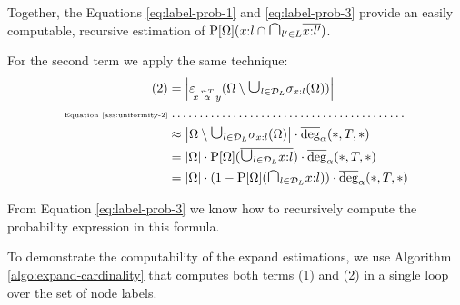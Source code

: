 Together, the Equations \ref{eq:label-prob-1} and \ref{eq:label-prob-3}
provide an easily computable, recursive estimation of
$\prob{\Omega}(x{:}l \isect \bigisect_{l' \in L} \overline{x{:}l'})$.


For the second term we apply the same technique:
\begin{align}
\begin{split}
  \text{(2)} &= \card{\expandvar{x}{r:T}{\alpha}{y}(
                      \Omega \setminus
                        \bigunion_{l \in \nlabels} \selection{x:l}(\Omega))} \\
            \text{\tiny Equation \ref{ass:uniformity-2}} &\omit\dotfill \\
             &\approx
                \card{\Omega \setminus
                        \bigunion_{l \in \nlabels} \selection{x:l}(\Omega)}
                \cdot \avgdeg_\alpha(*,T,*) \\
             &= \card{\Omega}
                \cdot \prob{\Omega}(\overline{\bigunion_{l \in \nlabels} x{:}l})
                \cdot \avgdeg_\alpha(*,T,*) \\
             &= \card{\Omega}
                \cdot (1 - \prob{\Omega}(\bigisect_{l \in \nlabels} x{:}l))
                \cdot \avgdeg_\alpha(*,T,*)
\end{split}
\end{align}

From Equation \ref{eq:label-prob-3} we know how to recursively compute the probability
expression in this formula.

\begingroup
\newcommand{\estDeg}{\textit{estDeg}}
\newcommand{\remaining}{\textit{remaining}}
\newcommand{\oldRemaining}{\textit{oldRemaining}}
\newcommand{\newRemaining}{\textit{newRemaining}}
\newcommand{\superLabels}{\textit{superLabels}}
\newcommand{\coveredLabels}{\textit{coveredLabels}}
\newcommand{\notCoveredBySuperLabels}{\textit{notCoveredBySuperLabels}}
\newcommand{\changed}{\textit{changed}}

To demonstrate the computability of the expand estimations,
we use Algorithm \ref{algo:expand-cardinality} that computes both terms (1)
and (2) in a single loop over the set of node labels.

